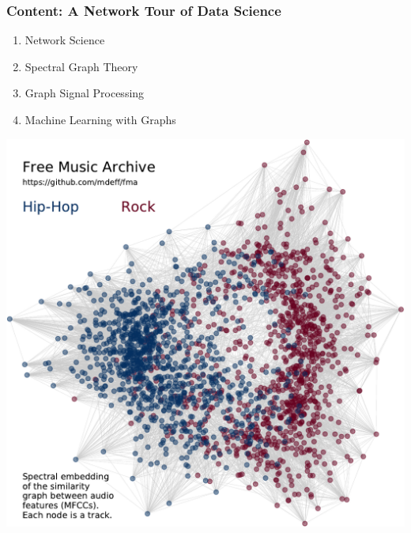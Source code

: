 \documentclass[aspectratio=169]{beamer}
\begin{document}
\begin{frame}
	\frametitle{Content: \textbf{A Network Tour} of Data Science}
	\begin{minipage}{0.41\linewidth}
		\begin{enumerate}
			\item Network Science
			\vspace{2em}
			\item Spectral Graph Theory
			\vspace{2em}
			\item Graph Signal Processing
			\vspace{2em}
			\item Machine Learning with Graphs
		\end{enumerate}
	\end{minipage}
	\hfill
	\begin{minipage}{0.57\linewidth}
		\includegraphics[width=\linewidth]{fma_illustration}
	\end{minipage}
\end{frame}

\end{document}
